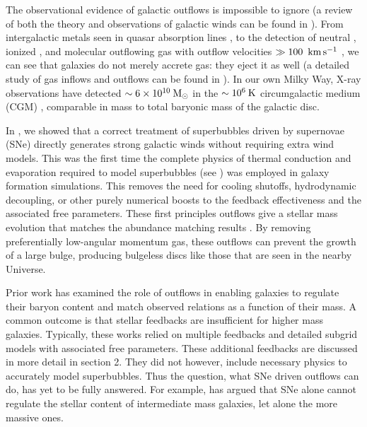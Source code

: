 The observational evidence of galactic outflows is impossible to ignore (a
review of both the theory and observations of galactic winds can be found in
\citealt{Veilleux2005}).  From intergalactic metals seen in quasar absorption
lines \citep{Songaila1996,Dave1998,Weiner2009}, to the detection of neutral
\citep{Kunth1998,Morganti2003}, ionized \citep{Heckman1987,Martin2012}, and
molecular \citep{Stark1984} outflowing gas with outflow velocities $\gg
100\;\>{\rm km}\,{\rm s}^{-1}$ \citep{Leroy2015}, we can see that galaxies do not merely
accrete gas: they eject it as well (a detailed study of gas inflows and outflows
can be found in \citet{Woods2014}). In our own Milky Way, X-ray observations
have detected $\sim6\times10^{10}\>{\rm M_{\odot}}$ in the $\sim10^6\>{\rm K}$ circumgalactic medium
(CGM) \citep{Gupta2012}, comparable in mass to total baryonic mass of the galactic disc.

In \citet{Keller2015}, we showed that a correct treatment of superbubbles driven
by supernovae (SNe) directly generates strong galactic winds without requiring extra
wind models.  This was the first time the complete physics of thermal conduction
and evaporation required to model superbubbles (see \citealt{Keller2014}) was
employed in galaxy formation simulations.  This removes the need for cooling
shutoffs, hydrodynamic decoupling, or other purely numerical boosts to the
feedback effectiveness and the associated free parameters.  These first
principles outflows give a stellar mass evolution that matches the abundance
matching results \citep{Behroozi2013}.  By removing preferentially low-angular
momentum gas, these outflows can prevent the growth of a large bulge, producing
bulgeless discs like those that are seen in the nearby Universe.

Prior work \citep{Stinson2013,Hopkins2014,Agertz2015} has examined the role of
outflows in enabling galaxies to regulate their baryon content and match
observed relations as a function of their mass.  A common outcome is that
stellar feedbacks are insufficient for higher mass galaxies.  Typically, these
works relied on multiple feedbacks and detailed subgrid models with associated
free parameters.  These additional feedbacks are discussed in more detail in section 2.  They
did not however, include necessary physics to accurately model superbubbles.
Thus the question, what SNe driven outflows can do, has yet to be fully
answered.   For example, \citet{Hopkins2014} has argued that SNe alone
cannot regulate the stellar content of intermediate mass galaxies, let alone the
more massive ones.  

